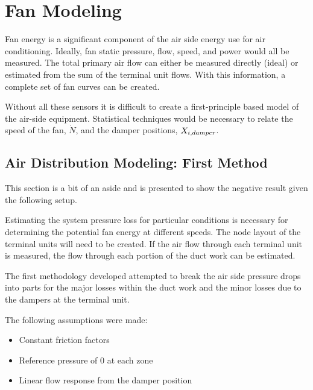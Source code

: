 

\section{Fan Modeling}\label{sec:FanModeling}

Fan energy is a significant component of the air side energy use for air
conditioning. Ideally, fan static pressure, flow, speed, and power would
all be measured.  The total primary air flow can either be measured
directly (ideal) or estimated from the sum of the terminal
unit flows. With this information, a complete set of fan curves can be
created.

Without all these sensors it is difficult to create a first-principle based model
of the air-side equipment. Statistical techniques would be necessary to relate
the speed of the fan, \(\dot N\), and the damper positions,
\(X_{i,damper}\).

\subsection{Air Distribution Modeling: First Method}
This section is a bit of an aside and is presented to show the negative
result given the following setup.

Estimating the system pressure loss for particular conditions is
necessary for determining the potential fan energy at different speeds.
The node layout of the terminal units will need to be created. If the air
flow through each terminal unit is measured, the flow through each
portion of the duct work can be estimated.

The first methodology developed attempted to break the air side pressure
drops into parts for the major losses within the duct work and the minor
losses due to the dampers at the terminal unit.

The following assumptions were made:

\begin{itemize}
    \item Constant friction factors
    \item Reference pressure of 0 at each zone
    \item Linear flow response from the damper position
\end{itemize}


